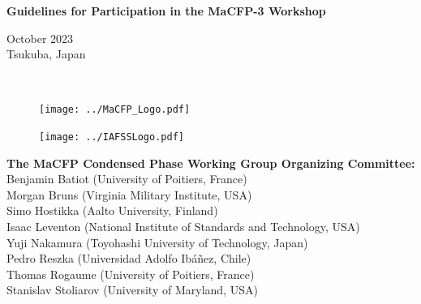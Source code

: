 \documentclass[12pt]{article}
\begin{document}

\thispagestyle{empty}


\vspace*{0.75in}

\begin{center}
\begin{Large}
{\bf Guidelines for Participation in the MaCFP-3 Workshop} \\
\end{Large}
\begin{large}
October 2023\\
Tsukuba, Japan
\end{large}
\hspace{1in} \\
\end{center}


\begin{figure}[h]
  \centering
  \texttt{[image: ../MaCFP\_Logo.pdf]}
  \label{Cover_Image}
\end{figure}

\vfill

\begin{minipage}{0.25\textwidth}
\begin{figure}[H]
\texttt{[image: ../IAFSSLogo.pdf]}
\end{figure}
\end{minipage} \hfill
\begin{minipage}{0.75\textwidth}
\begin{flushright}
\begin{small}
{\bf The MaCFP Condensed Phase Working Group Organizing Committee:} \\
Benjamin Batiot (University of Poitiers, France) \\
Morgan Bruns (Virginia Military Institute, USA) \\
Simo Hostikka (Aalto University, Finland) \\
Isaac Leventon (National Institute of Standards and Technology, USA) \\
Yuji Nakamura (Toyohashi University of Technology, Japan) \\
Pedro Reszka (Universidad Adolfo Ibáñez, Chile) \\
Thomas Rogaume (University of Poitiers, France) \\
Stanislav Stoliarov (University of Maryland, USA)
\end{small}
\end{flushright}
\end{minipage}

\newpage
\thispagestyle{empty}
\tableofcontents
\end{document}
